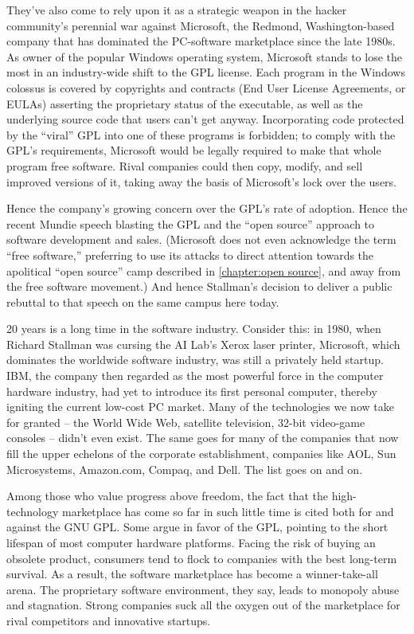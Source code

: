 They've also come to rely upon it as a strategic weapon in the hacker community's perennial war against Microsoft, the Redmond, Washington-based company that has dominated the PC-software marketplace since the late 1980s. As owner of the popular Windows operating system, Microsoft stands to lose the most in an industry-wide shift to the GPL license. Each program in the Windows colossus is covered by copyrights and contracts (End User License Agreements, or EULAs) asserting the proprietary status of the executable, as well as the underlying source code that users can't get anyway. Incorporating code protected by the ``viral'' GPL into one of these programs is forbidden; to comply with the GPL's requirements, Microsoft would be legally required to make that whole program free software. Rival companies could then copy, modify, and sell improved versions of it, taking away the basis of Microsoft's lock over the users.

Hence the company's growing concern over the GPL's rate of adoption. Hence the recent Mundie speech blasting the GPL and the ``open source'' approach to software development and sales. (Microsoft does not even acknowledge the term ``free software,'' preferring to use its attacks to direct attention towards the apolitical ``open source'' camp described in \autoref{chapter:open source}, and away from the free software movement.) And hence Stallman's decision to deliver a public rebuttal to that speech on the same campus here today.

20 years is a long time in the software industry. Consider this: in 1980, when Richard Stallman was cursing the AI Lab's Xerox laser printer, Microsoft, which dominates the worldwide software industry, was still a privately held startup. IBM, the company then regarded as the most powerful force in the computer hardware industry, had yet to introduce its first personal computer, thereby igniting the current low-cost PC market. Many of the technologies we now take for granted -- the World Wide Web, satellite television, 32-bit video-game consoles -- didn't even exist. The same goes for many of the companies that now fill the upper echelons of the corporate establishment, companies like AOL, Sun Microsystems, Amazon.com, Compaq, and Dell. The list goes on and on.

Among those who value progress above freedom,
the fact that the high-technology marketplace has come so far in such little time is cited both for and against the GNU GPL.  Some argue in favor of the GPL, pointing to the short lifespan of most computer hardware platforms. Facing the risk of buying an obsolete product, consumers tend to flock to companies with the best long-term survival. As a result, the software marketplace has become a winner-take-all arena. The proprietary software environment, they say, leads to monopoly abuse and stagnation. Strong companies suck all the oxygen out of the marketplace for rival competitors and innovative startups.

